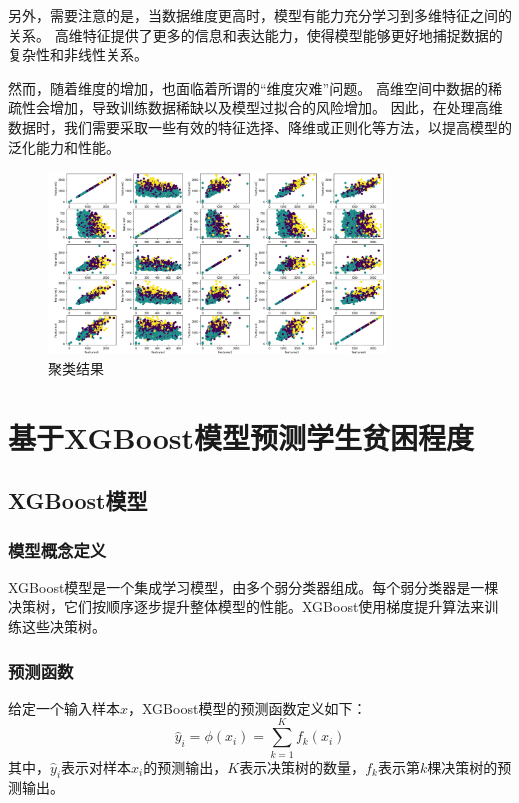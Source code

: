 \documentclass{article}
\begin{document}
另外，需要注意的是，当数据维度更高时，模型有能力充分学习到多维特征之间的关系。
高维特征提供了更多的信息和表达能力，使得模型能够更好地捕捉数据的复杂性和非线性关系。

然而，随着维度的增加，也面临着所谓的“维度灾难”问题。
高维空间中数据的稀疏性会增加，导致训练数据稀缺以及模型过拟合的风险增加。
因此，在处理高维数据时，我们需要采取一些有效的特征选择、降维或正则化等方法，以提高模型的泛化能力和性能。

\begin{figure}[htbp]
  \centering
  \includegraphics[width=0.8\textwidth]{pca result.png}
  \caption{聚类结果}
  \label{Clustering_result}
\end{figure}

\section{基于XGBoost模型预测学生贫困程度}

\subsection{XGBoost模型}

\subsubsection{模型概念定义}
XGBoost模型是一个集成学习模型，由多个弱分类器组成。每个弱分类器是一棵决策树，它们按顺序逐步提升整体模型的性能。XGBoost使用梯度提升算法来训练这些决策树。\cite{reference7}

\subsubsection{预测函数}
给定一个输入样本$x$，XGBoost模型的预测函数定义如下：
\[
\hat{y}_i = \phi(x_i) = \sum_{k=1}^{K} f_k(x_i)
\]
其中，$\hat{y}_i$表示对样本$x_i$的预测输出，$K$表示决策树的数量，$f_k$表示第$k$棵决策树的预测输出。
\end{document}
